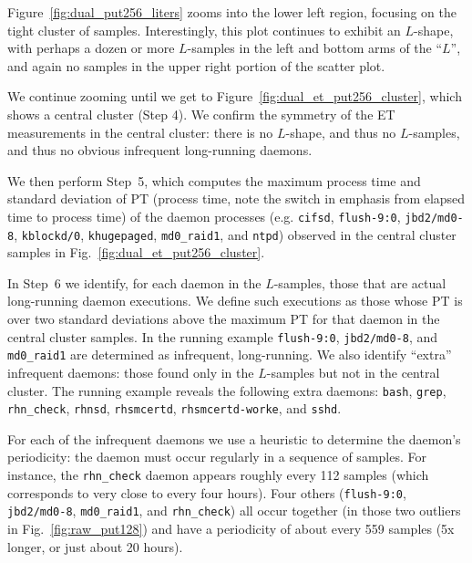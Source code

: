 \documentclass[letter]{ieice}
\begin{document}
Figure~\ref{fig:dual_put256_liters} zooms into the lower left region,
focusing on the
tight cluster of samples.  Interestingly, this plot continues to exhibit an
$L$-shape, with perhaps a dozen or more $L$-samples in the left and bottom arms of
the ``$L$'', and again no samples in the upper right portion of the
scatter plot.

We continue zooming until we get to Figure~\ref{fig:dual_et_put256_cluster},
which shows a central cluster (Step 4). 
We confirm the symmetry of the ET measurements in the central cluster: there
is no $L$-shape, and thus no $L$-samples, and thus no obvious infrequent
long-running daemons.

We then perform Step~5, which computes 
the maximum process time and standard deviation 
of PT (process time, note the switch in emphasis from elapsed time 
to process time) of the daemon processes 
(e.g. {\tt cifsd}, {\tt flush-9:0}, {\tt jbd2/md0-8}, 
{\tt kblockd/0}, {\tt khugepaged}, {\tt md0\_raid1}, and {\tt ntpd})
observed in the central cluster samples in Fig.~\ref{fig:dual_et_put256_cluster}. 

In Step~6 we identify, for each daemon in the \hbox{$L$-samples}, 
those that are actual long-running daemon
executions.  We define such executions as those whose PT 
is over two standard deviations above the maximum PT for
that daemon in the central cluster samples. 
In the running example  {\tt flush-9:0}, 
{\tt jbd2/md0-8}, and {\tt md0\_raid1} 
are determined as infrequent, long-running.
We also identify ``extra'' infrequent daemons: those
found only in the $L$-samples but not in the central cluster. 
The running example reveals the following extra daemons: 
{\tt bash}, {\tt grep}, {\tt rhn\_check}, {\tt rhnsd}, {\tt rhsmcertd}, 
{\tt rhsmcertd-worke}, and {\tt sshd}.

For each of the infrequent daemons 
we use a heuristic to determine the daemon's periodicity: 
the daemon must occur regularly in a sequence of samples.
For instance, the {\tt rhn\_check} daemon appears 
roughly every 112 samples (which corresponds to very close to every four 
hours). Four others ({\tt flush-9:0}, {\tt jbd2/md0-8}, 
{\tt md0\_raid1}, and {\tt rhn\_check}) all occur together 
(in those two outliers in Fig.~\ref{fig:raw_put128}) and 
  have a periodicity of about every 559 samples
  (5x longer, or just about 20 hours). 
\end{document}
